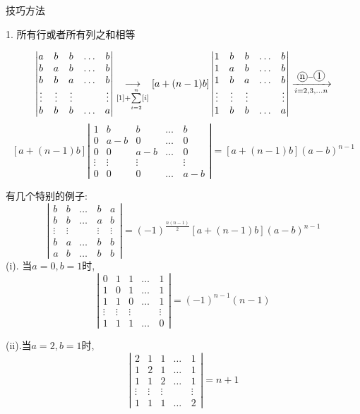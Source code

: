 \begin{theorem}
	技巧方法
	
	1. 所有行或者所有列之和相等
	
	$$\left|\begin{matrix}
		a&b&b&\dots&b\\
		b&a&b&\dots&b\\
		b&b&a&\dots&b\\
		\vdots&\vdots&\vdots&\quad &\vdots\\
		b&b&b&\dots&a
	\end{matrix} \right|
	\underset{[1]+\sum\limits_{i=2}^{n}[i]}{\longrightarrow}
	[a+(n-1)b]\left|\begin{matrix}
		1&b&b&\dots&b\\
		1&a&b&\dots&b\\
		1&b&a&\dots&b\\
		\vdots&\vdots&\vdots&\quad &\vdots\\
		1&b&b&\dots&a
	\end{matrix} \right|\xrightarrow[i=2,3,\dots n]{\circled{n}-\circled{1}}$$ $$[a+(n-1)b]\left|\begin{matrix}
		1&b&b&\dots&b\\
		0&a-b&0&\dots&0\\
		0&0&a-b&\dots&0\\
		\vdots&\vdots&\vdots&\quad &\vdots\\
		0&0&0&\dots&a-b
	\end{matrix} \right|=[a+(n-1)b](a-b)^{n-1}$$
	
	有几个特别的例子:  
	$$\left|\begin{matrix}
		b&b&\dots&b&a\\
		b&b&\dots&a&b\\
		\vdots&\vdots&\quad&\vdots &\vdots\\
		b&a&\dots&b&b\\
		a&b&\dots&b&b
	\end{matrix} \right|=(-1)^{\frac{n(n-1)}{2}}[a+(n-1)b](a-b)^{n-1}$$
	(i). 当$a=0,b=1$时,
	$$\left|\begin{matrix}
		0&1&1&\dots&1\\
		1&0&1&\dots&1\\
		1&1&0&\dots&1\\
		\vdots&\vdots&\vdots&\quad &\vdots\\
		1&1&1&\dots&0
	\end{matrix} \right|=(-1)^{n-1}(n-1)$$
	
	(ii).当$a=2,b=1$时,
	$$\left|\begin{matrix}
		2&1&1&\dots&1\\
		1&2&1&\dots&1\\
		1&1&2&\dots&1\\
		\vdots&\vdots&\vdots&\quad &\vdots\\
		1&1&1&\dots&2
	\end{matrix} \right|=n+1$$
	

\end{theorem}
